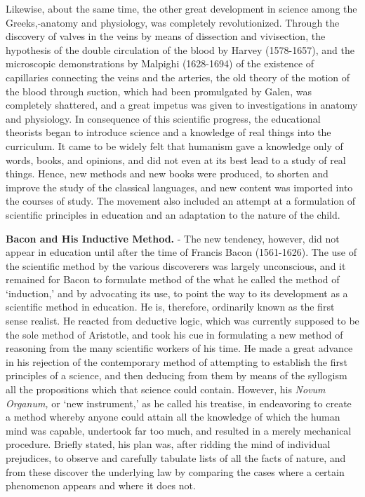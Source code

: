 \documentclass[]{book}
\begin{document}
Likewise, about the same time, the other great development in science among the Greeks,-anatomy and physiology, was completely revolutionized. Through the discovery of valves in the veins by means of dissection and vivisection, the hypothesis of the double circulation of the blood by Harvey (1578-1657), and the microscopic demonstrations by Malpighi (1628-1694) of the existence of capillaries connecting the veins and the arteries, the old theory of the motion of the blood through suction, which had been promulgated by Galen, was completely shattered, and a great impetus was given to investigations in anatomy and physiology. In consequence of this scientific progress, the educational theorists began to introduce science and a knowledge of real things into the curriculum. It came to be widely felt that humanism gave a knowledge only of words, books, and opinions, and did not even at its best lead to a study of real things. Hence, new methods and new books were produced, to shorten and improve the study of the classical languages, and new content was imported into the courses of study. The movement also included an attempt at a formulation of scientific principles in education and an adaptation to the nature of the child.

\textbf{Bacon and His Inductive Method.} - The new tendency, however, did not appear in education until after the time of Francis Bacon (1561-1626). The use of the scientific method by the various discoverers was largely unconscious, and it remained for Bacon to formulate method of the what he called the method of `induction,' and by advocating its use, to point the way to its development as a scientific method in education. He is, therefore, ordinarily known as the first sense realist. He reacted from deductive logic, which was currently supposed to be the sole method of Aristotle, and took his cue in formulating a new method of reasoning from the many scientific workers of his time. He made a great advance in his rejection of the contemporary method of attempting to establish the first principles of a science, and then deducing from them by means of the syllogism all the propositions which that science could contain. However, his \emph{Novum Organum,} or `new instrument,' as he called his treatise, in endeavoring to create a method whereby anyone could attain all the knowledge of which the human mind was capable, undertook far too much, and resulted in a merely mechanical procedure. Briefly stated, his plan was, after ridding the mind of individual prejudices, to observe and carefully tabulate lists of all the facts of nature, and from these discover the underlying law by comparing the cases where a certain phenomenon appears and where it does not.
\end{document}
